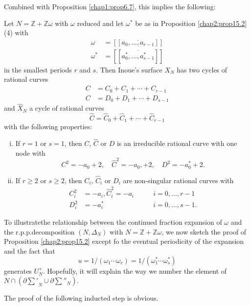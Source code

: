 Combined with Proposition \ref{chap1:prop6.7}, this implies the following: 

\setcounter{prop}{3}
\begin{prop}\label{chap2:prop15.4} %
Let $N = \mathbb{Z}+\mathbb{Z}\omega$ with $\omega$ reduced and let
$\omega^*$ be as in Proposition \ref{chap2:prop15.2} (4) with  
\begin{align*}
 \omega & = [[ \overline{a_0,  \ldots , a_{r-1}}]]\\
 \omega^* & = [[ \overline{a^*_0,  \ldots , a^*_{s-1}}]]
 \end{align*}
 in the smallest periods $r$ and $s$. Then Inoue's surface $X_N$ has
 two cycles of rational curves  
 \begin{align*}
C & = C_0 + C_1 + \cdots + C_{r-1}\\
C & = D_0+ D_1 + \cdots + D_{s-1}
\end{align*}
and $\hat{X}_N$ a cycle of rational curves 
$$
\hat{C} = \hat{C}_0 + \hat{C}_1 + \cdots + \hat{C}_{r-1} 
$$
with the following properties: 
\begin{enumerate}[(i)]
\item If $r=1$ or $s = 1$, then $C$, $\hat{C}$ or $D$ is an
  irreducible  rational curve with one node with   
$$
C^2 = -a_0 + 2, \quad \hat{C}^2 = -a_0, + 2,  \quad D^2 = -a^*_0 +
2.  
$$

\item If $r \geq 2$ or $s \geq 2$, then $C_i$, $\hat{C}_i$  or
  $D_i$  are non-singular rational curves with   
\begin{align*}
C^2_i & = -a_i , \hat{C}^2_i = -a_i \qquad &i =0, \ldots , r-1 \\
 D^2_i & = -a^*_i \qquad &i = 0, \ldots , s-1. 
\end{align*}
\end{enumerate}
\end{prop}

To illustrate\pageoriginale the relationship between the continued
fraction expansion of $\omega$ and the r.p.p.decomposition
$(N,\Delta_N)$ with $N=\mathbb{Z}+\mathbb{Z}\omega$, we now sketch the
proof of Proposition \ref{chap2:prop15.2} except fo the eventual
periodicity of the expansion and the fact that   
 $$
 u=1/(\omega_1 \cdots \omega_r)=1/(\omega^*_1 \cdots \omega^*_s) 
 $$
  generates $U^+_N$. Hopefully, it will explain the way we number the
 element of $N \cap (\partial {\sum'}_{N} \cup \partial  \sum''_N)$. 
 
 The proof of the following inducted step is obvious.

